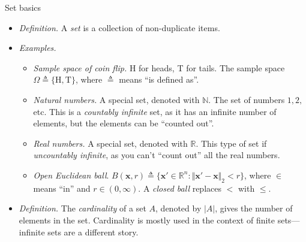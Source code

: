 \documentclass{beamer}
\numberwithin{equation}{section}
\begin{document}
\begin{frame}{Set basics}
    \begin{itemize}
        \item
        \textit{Definition.} A \textit{set} is a collection of non-duplicate
        items.

        \item
        \textit{Examples.}
        \begin{itemize}
            \item
            \textit{Sample space of coin flip.} H for heads, T for tails. The
            sample space $ \Omega \triangleq \{\text{H}, \text{T}\} $, where
            $ \triangleq $ means ``is defined as''.

            \item
            \textit{Natural numbers.} A special set, denoted with
            $ \mathbb{N} $. The set of numbers $ 1, 2, $ etc. This is a
            \textit{countably infinite} set, as it has an infinite number of
            elements, but the elements can be ``counted out''.

            \item
            \textit{Real numbers.} A special set, denoted with $ \mathbb{R} $.
            This type of set if \textit{uncountably infinite}, as you can't
            ``count out'' all the real numbers.

            \item
            \textit{Open Euclidean ball}. $ B(\mathbf{x}, r) \triangleq
            \{\mathbf{x}' \in \mathbb{R}^n : \Vert\mathbf{x}' - \mathbf{x}
            \Vert_2 < r\} $, where $ \in $ means ``in'' and
            $ r \in (0, \infty) $. A \textit{closed ball} replaces $ < $ with
            $ \le $.
        \end{itemize}

        \item
        \textit{Definition.} The \textit{cardinality} of a set $ A $, denoted
        by $ |A| $, gives the number of elements in the set. Cardinality is
        mostly used in the context of finite sets---infinite sets are a
        different story.
    \end{itemize}
\end{frame}
\end{document}
